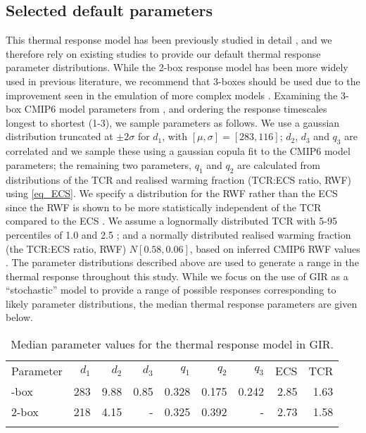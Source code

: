 \documentclass[gmd, manuscript]{copernicus}
\begin{document}
\subsection*{Selected default parameters}
This thermal response model has been previously studied in detail \citep{Geoffroy2013,Geoffroy2013a,Gregory2015,Smith2017}, and we therefore rely on existing studies to provide our default thermal response parameter distributions. While the 2-box response model has been more widely used in previous literature, we recommend that 3-boxes should be used due to the improvement seen in the emulation of more complex models \citep{Tsutsui2017}.  Examining the 3-box CMIP6 model parameters from \cite{Tsutsui2019}, and ordering the response timescales longest to shortest (1-3), we sample parameters as follows. We use a gaussian distribution truncated at $\pm2\sigma$ for $d_1$, with $[\mu,\sigma] = [283 , 116]$; $d_2$, $d_3$ and $q_3$ are correlated and we sample these using a gaussian copula fit to the CMIP6 model parameters; the remaining two parameters, $q_1$ and $q_2$ are calculated from distributions of the TCR and realised warming fraction (TCR:ECS ratio, RWF) using \ref{eq_ECS}. We specify a distribution for the RWF rather than the ECS since the RWF is shown to be more statistically independent of the TCR compared to the ECS \citep{Millar2015}. We assume a lognormally distributed TCR with 5-95 percentiles of 1.0 and 2.5 \citep{Collins2013}; and a normally distributed realised warming fraction (the TCR:ECS ratio, RWF) $N[0.58 , 0.06]$, based on inferred CMIP6 RWF values \citep{Tsutsui2019}. The parameter distributions described above are used to generate a range in the thermal response throughout this study. While we focus on the use of GIR as a ``stochastic'' model to provide a range of possible responses corresponding to likely parameter distributions, the median thermal response parameters are given below.

\begin{table}[t]
    \caption{Median parameter values for the thermal response model in GIR.} \label{tab:thermparameters}
    \begin{tabular}{l r r r r r r r r}
    \tophline
    Parameter & $d_1$ & $d_2$ & $d_3$ & $q_1$ & $q_2$ & $q_3$ & ECS & TCR\\
    \middlehline
    3-box & 283 & 9.88 & 0.85 & 0.328 & 0.175 & 0.242 & 2.85 & 1.63 \\
    2-box & 218 &  4.15 & - & 0.325 & 0.392 & - & 2.73 & 1.58 \\
    \bottomhline
    \end{tabular}
    \belowtable{} %
\end{table}
\end{document}
